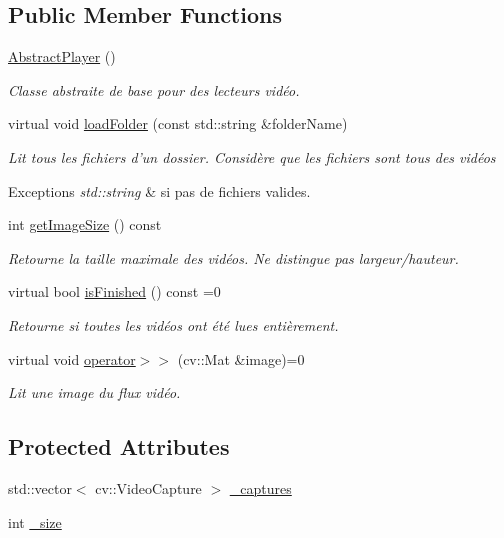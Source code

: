 \subsection*{Public Member Functions}
\begin{DoxyCompactItemize}
\item 
\hyperlink{classAbstractPlayer_a4987602a4b3381a9c592585dde7cf33b}{Abstract\+Player} ()
\begin{DoxyCompactList}\small\item\em Classe abstraite de base pour des lecteurs vidéo. \end{DoxyCompactList}\item 
virtual void \hyperlink{classAbstractPlayer_a2091b1757bfd13116dfa4612af55473b}{load\+Folder} (const std\+::string \&folder\+Name)
\begin{DoxyCompactList}\small\item\em Lit tous les fichiers d'un dossier.  Considère que les fichiers sont tous des vidéos 
\begin{DoxyExceptions}{Exceptions}
{\em std\+::string} & si pas de fichiers valides. \\
\hline
\end{DoxyExceptions}
\end{DoxyCompactList}\item 
int \hyperlink{classAbstractPlayer_a8bdc017fb32c90e6635ed6b7491fbe98}{get\+Image\+Size} () const 
\begin{DoxyCompactList}\small\item\em Retourne la taille maximale des vidéos. Ne distingue pas largeur/hauteur. \end{DoxyCompactList}\item 
virtual bool \hyperlink{classAbstractPlayer_a841896a599ebe6b8317905de78c44bcc}{is\+Finished} () const =0
\begin{DoxyCompactList}\small\item\em Retourne si toutes les vidéos ont été lues entièrement. \end{DoxyCompactList}\item 
virtual void \hyperlink{classAbstractPlayer_a5c9a863c96224dd297aa44c69010cd94}{operator$>$$>$} (cv\+::\+Mat \&image)=0
\begin{DoxyCompactList}\small\item\em Lit une image du flux vidéo. \end{DoxyCompactList}\end{DoxyCompactItemize}
\subsection*{Protected Attributes}
\begin{DoxyCompactItemize}
\item 
std\+::vector$<$ cv\+::\+Video\+Capture $>$ \hyperlink{classAbstractPlayer_a72dd2ef25310decd45671a7d51e1f319}{\+\_\+captures}
\item 
int \hyperlink{classAbstractPlayer_a9d8395a141cc985622d4910209bc7d53}{\+\_\+size}
\end{DoxyCompactItemize}


